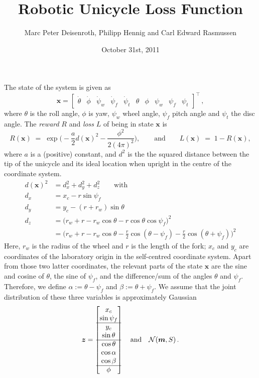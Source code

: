 \documentclass{article}
\title{Robotic Unicycle Loss Function}
\author{Marc Peter Deisenroth, Philipp Hennig and Carl Edward Rasmussen}
\date{October 31st, 2011}
\newcommand{\bfm}{{\vec m}}
\newcommand{\T}{^{\top}}
\renewcommand{\vec}[1]{\boldsymbol{#1}}
\begin{document}
\maketitle
The state of the system is given as
\begin{equation*}
\vec x = 
\begin{bmatrix}
\dot\theta & \dot\phi &\dot\psi_w & \dot\psi_f & \dot\psi_t & \theta &
\phi & \psi_w & \psi_f & \psi_t
\end{bmatrix}\T\,,
\end{equation*}
%
where $\theta$ is the roll angle, $\phi$ is yaw, $\psi_w$ wheel angle,
$\psi_f$ pitch angle and $\psi_t$ the disc angle. The \emph{reward}
$R$ and \emph{loss} $L$ of being in state $\vec x$ is
\[
R(\vec x)\;=\;\exp\big(-\frac{a}{2}d(\vec x)^2-\frac{\phi^2}{2(4\pi)^2}\big),
\qquad\text{and}\qquad L(\vec x)\;=\;1-R(\vec x),
\]
where $a$ is a (positive) constant, and $d^2$ is the the squared
distance between the tip of the unicycle and its ideal location when
upright in the centre of the coordinate system.
\begin{equation*}
  \begin{aligned}
d(\vec x)^2&= d_x ^2 + d_y ^2 + d_z ^2 \qquad \text{with}\\
d_x&= x_c -r \sin \psi_f\\
d_y&= y_c -(r+r_w)\sin\theta\\
d_z&=\big(r_w+r-r_w\cos\theta-r\cos\theta\cos\psi_f\big)^2\\
&=\big(r_w+r-r_w\cos\theta-\tfrac{r}{2}\cos(\theta-\psi_f)
-\tfrac{r}{2}\cos(\theta+\psi_f)\big)^2    
  \end{aligned}
\end{equation*}
Here, $r_w$ is the radius of the wheel and $r$ is the length of the
fork; $x_c$ and $y_c$ are coordinates of the laboratory origin in the
self-centred coordinate system. Apart from those two latter
coordinates, the relevant parts of the state $\vec x$ are the sine and
cosine of $\theta$, the sine of $\psi_f$, and the difference/sum of
the angles $\theta$ and $\psi_f$. Therefore, we define $\alpha :=
\theta-\psi_f$ and $\beta := \theta + \psi_f$. We assume that the
joint distribution of these three variables is approximately Gaussian
\begin{equation*}
\vec z = 
\begin{bmatrix}
x_c \\
\sin\psi_f\\
\hline
y_c \\
\sin\theta\\
\hline
\cos\theta\\
\cos\alpha\\
\cos\beta\\
\hline
\phi
\end{bmatrix}
\quad
\text{and}
\quad
{\cal N}(\bfm, S)\,.
\end{equation*}
\end{document}
